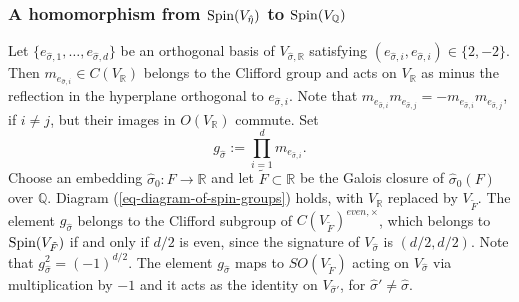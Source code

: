 \documentclass[12pt]{amsart}
\newcommand{\hide}[1]{}
\numberwithin{equation}{subsection}
\theoremstyle{plain}
\theoremstyle{definition}
\newcommand{\QQ}{{\mathbb Q}}
\newcommand{\RR}{{\mathbb R}}
\newcommand{\ZZ}{{\mathbb Z}}
\newcommand{\Spin}{{\rm Spin}}
\newcommand{\LongRightArrowOf}[1]{\stackrel{#1}{\longrightarrow}}
\begin{document}
{%

\hide{
The direct sum
$\oplus_{\hat{\sigma}\in\hat{\Sigma}}V_{\hat{\sigma}}$, considered as a subspace of $V_\QQ\otimes_\QQ(F\otimes_\QQ\RR)$, is equal to the image of
$V_\QQ\otimes_\QQ F$ via
\begin{equation}
\label{eq-embedding-of-V-tensor-F}
V_\QQ\otimes_\QQ F\LongRightArrowOf{(id_{V_\QQ}\otimes \hat{\sigma})_{\hat{\sigma}\in\hat{\Sigma}}} V_\QQ\otimes_\QQ \left(\prod_{\hat{\sigma}\in\hat{\Sigma}}\RR\right)
\cong V_\QQ\otimes_\QQ (F\otimes_\QQ \RR).
\end{equation}
}

%
\subsubsection{A homomorphism from $\Spin(V_{\hat{\eta}})$ to $\Spin(V_\QQ)$}
Let $\{e_{\hat{\sigma},1}, \dots, e_{\hat{\sigma},d}\}$ be an orthogonal basis of $V_{\hat{\sigma},\RR}$ satisfying $(e_{\hat{\sigma},i},e_{\hat{\sigma},i})\in\{2,-2\}$. Then $m_{e_{\hat{\sigma},i}}\in C(V_\RR)$ belongs to the Clifford group and acts on $V_\RR$ as minus the reflection in the hyperplane orthogonal to $e_{\hat{\sigma},i}$. Note that $m_{e_{\hat{\sigma},i}}m_{e_{\hat{\sigma},j}}=-m_{e_{\hat{\sigma},i}}m_{e_{\hat{\sigma},j}}$, if $i\neq j$, but their images in $O(V_\RR)$ commute.
Set 
\begin{equation}
\label{eq-g-hat-sigma}
g_{\hat{\sigma}}:=\prod_{i=1}^dm_{e_{\hat{\sigma},i}}.
\end{equation} 
Choose an embedding $\hat{\sigma}_0:F\rightarrow \RR$ and let $\tilde{F}\subset \RR$ be the Galois closure of $\hat{\sigma}_0(F)$ over $\QQ$. Diagram (\ref{eq-diagram-of-spin-groups}) holds, with $V_\RR$ replaced by $V_{\tilde{F}}$.
The element $g_{\hat{\sigma}}$ belongs to the Clifford subgroup of $C(V_{\tilde{F}})^{even,\times}$, which belongs to $\Spin(V_{\tilde{F}})$ if and only if $d/2$ is even, since the signature of $V_{\hat{\sigma}}$ is $(d/2,d/2)$. Note that $g_{\hat{\sigma}}^2=(-1)^{d/2}$.
The element 
$g_{\hat{\sigma}}$ maps to $SO(V_{\tilde{F}})$ acting on $V_{\hat{\sigma}}$ via multiplication by  $-1$ and it acts as the identity on $V_{\hat{\sigma}'}$, 
for $\hat{\sigma}'\neq \hat{\sigma}$. 

}
\end{document}
